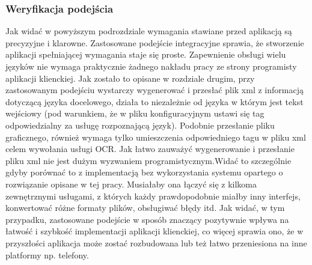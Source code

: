 \subsubsection{Weryfikacja podejścia}
Jak widać w powyższym podrozdziale wymagania stawiane przed aplikacją są precyzyjne i klarowne. Zastosowane podejście integracyjne sprawia, że stworzenie aplikacji spełniającej wymagania staje się proste. Zapewnienie obsługi wielu języków nie wymaga praktycznie żadnego nakładu pracy ze strony programisty aplikacji klienckiej. Jak zostało to opisane w rozdziale drugim, przy zastosowanym podejściu wystarczy wygenerować i przesłać plik xml z informacją dotyczącą języka docelowego, działa to niezależnie od języka w którym jest tekst wejściowy (pod warunkiem, że w pliku konfiguracyjnym ustawi się tag odpowiedzialny za usługę rozpoznającą język). Podobnie przesłanie pliku graficznego, również wymaga tylko umieszczenia odpowiedniego tagu w pliku xml celem wywołania usługi OCR. Jak łatwo zauważyć wygenerowanie i przesłanie pliku xml nie jest dużym wyzwaniem programistycznym.Widać to szczególnie gdyby porównać to z implementacją bez wykorzystania systemu opartego o rozwiązanie opisane w tej pracy. Musiałaby ona łączyć się z kilkoma zewnętrznymi usługami, z których każdy prawdopodobnie miałby inny interfejs, konwertować różne formaty plików, obsługiwać błędy itd. Jak widać, w tym przypadku, zastosowane podejście w sposób znaczący pozytywnie wpływa na łatwość i szybkość implementacji aplikacji klienckiej, co więcej sprawia ono, że w przyszłości aplikacja może zostać rozbudowana lub też łatwo przeniesiona na inne platformy np. telefony. \\


